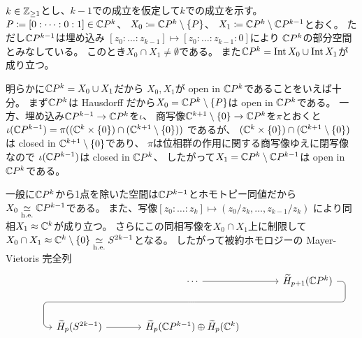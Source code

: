 \documentclass[report]{jlreq}
\begin{document}
\begin{answer}
    $k \in \mathbb{Z}_{\ge 1}$とし、$k - 1$での成立を仮定して$k$での成立を示す。
    $P \coloneqq [0 : \dots : 0 : 1] \in \mathbb{C} P^k$、
    $X_0 \coloneqq \mathbb{C} P^k \setminus \{ P \}$、
    $X_1 \coloneqq \mathbb{C} P^k \setminus \mathbb{C} P^{k - 1}$とおく。
    ただし$\mathbb{C} P^{k - 1}$は埋め込み
    $[z_0 : \dots : z_{k - 1}] \mapsto [z_0 : \dots : z_{k - 1} : 0]$により
    $\mathbb{C} P^k$の部分空間とみなしている。
    このとき$X_0 \cap X_1 \neq \emptyset$である。
    また$\mathbb{C} P^k = \operatorname{Int} X_0 \cup \operatorname{Int} X_1$が成り立つ。
    \begin{innerproof}
        明らかに$\mathbb{C} P^k = X_0 \cup X_1$だから
        $X_0, X_1$が open in $\mathbb{C} P^k$であることをいえば十分。
        まず$\mathbb{C} P^k$は Hausdorff だから$X_0 = \mathbb{C} P^k \setminus \{ P \}$は
        open in $\mathbb{C} P^k$である。
        一方、埋め込み$\mathbb{C} P^{k - 1} \to \mathbb{C} P^k$を$\iota$、
        商写像$\mathbb{C}^{k + 1} \setminus \{ 0 \} \to \mathbb{C} P^k$を$\pi$とおくと
        $\iota(\mathbb{C} P^{k - 1})
            = \pi((\mathbb{C}^k \times \{ 0 \}) \cap ( \mathbb{C}^{k + 1} \setminus \{ 0 \} ))$
        であるが、
        $(\mathbb{C}^k \times \{ 0 \}) \cap ( \mathbb{C}^{k + 1} \setminus \{ 0 \} )$は
        closed in $\mathbb{C}^{k + 1} \setminus \{ 0 \}$であり、
        $\pi$は位相群の作用に関する商写像ゆえに閉写像なので
        $\iota(\mathbb{C} P^{k - 1})$は closed in $\mathbb{C} P^k$、
        したがって$X_1 = \mathbb{C} P^k \setminus \mathbb{C} P^{k - 1}$は
        open in $\mathbb{C} P^k$である。
    \end{innerproof}
    一般に$\mathbb{C} P^k$から1点を除いた空間は$\mathbb{C} P^{k - 1}$とホモトピー同値だから
    $X_0 \simeqhe \C P^{k - 1}$である。
    また、写像$[z_0 : \dots : z_k] \mapsto (z_0 / z_k, \dots, z_{k - 1} / z_k)$
    により同相$X_1 \approx \mathbb{C}^k$が成り立つ。
    さらにこの同相写像を$X_0 \cap X_1$上に制限して
    $X_0 \cap X_1 \approx \C^k \setminus \{ 0 \} \simeqhe S^{2k - 1}$となる。
    したがって被約ホモロジーの Mayer-Vietoris 完全列
    \begin{equation}
        \begin{tikzcd}[column sep=large, row sep=large]
            && \cdots
                \ar{r} \ar[phantom]{d}[name=X1, anchor=center]{}
                & \widetilde{H}_{p+1}(\C P^k)
                    \ar[rounded corners,
                        to path={
                            -- ([xshift=2ex]\tikztostart.east)
                            |- (X1.center) \tikztonodes
                            -| ([xshift=-2ex]\tikztotarget.west)
                            -- (\tikztotarget)
                        }]{dll} \\
            & \widetilde{H}_p(S^{2k - 1})
                \ar{r}
                & \widetilde{H}_p(\C P^{k - 1}) \oplus \widetilde{H}_p(\C^k)

\end{tikzcd}
\end{equation}
\end{answer}
\end{document}
